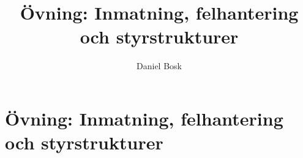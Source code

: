 \documentclass[a4paper,10pt,oneside,openright,
               oldfontcommands]{memoir}
\begin{document}
\title{%
  Övning: Inmatning, felhantering och styrstrukturer
}
\author{Daniel Bosk}

\maketitle

\begin{abstract}
  
\end{abstract}

\clearpage

\tableofcontents*

\chapter{Övning: Inmatning, felhantering och styrstrukturer}



\appendix


\printbibliography
\end{document}

